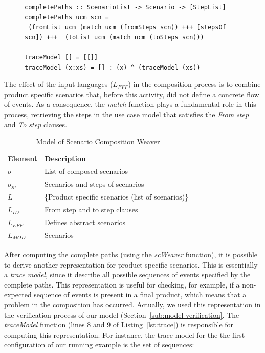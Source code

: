 \documentclass{acm_proc_article-sp}
\begin{document}
{\begin{figure}
\begin{lstlisting}[belowskip=10pt,frame=tb,caption={Scenario composition weaver function},label=lst:trace]
completePaths :: ScenarioList -> Scenario -> [StepList]
completePaths ucm scn =
 (fromList ucm (match ucm (fromSteps scn)) +++ [stepsOf scn]) +++  (toList ucm (match ucm (toSteps scn)))

traceModel [] = [[]]
traceModel (x:xs) = [] : (x) ^ (traceModel (xs))
\end{lstlisting}
\end{figure}

The effect of the input languages ($L_{EFF}$) in the composition process is to combine 
product specific scenarios that, before this activity, did not define a concrete flow of events. As a consequence, the \emph{match} function 
plays a fundamental role in this process, retrieving the steps in the use case model that satisfies the \emph{From step} and \emph{To step} clauses.  

\begin{table}[hbt]
\begin{center}
\caption{Model of Scenario Composition Weaver} \label{tab:sc-weaver}
\begin{tabular}{p{0.4in}p{2.6in}}
   \hline\noalign{\smallskip}
  {\bf Element} & {\bf Description} \\
   \noalign{\smallskip}
   \hline
   \noalign{\smallskip}
   $o$               & List of composed scenarios  \\ 
   $o_{jp}$        & Scenarios and steps of scenarios \\ 
   $L$               & \{Product specific scenarios (list of scenarios)\} \\ 
   $L_{ID}$       & From step and to step clauses \\ 
   $L_{EFF}$    & Defines abstract scenarios  \\ 
   $L_{MOD}$  &  Scenarios \\  
  \hline
  \end{tabular}
\end{center}
\end{table}



After computing the complete paths (using the \emph{scWeaver} function), it is possible to derive another representation for product specific scenarios. This is essentially a \emph{trace model}, since it describe all possible sequences of events specified by the complete paths. This representation is useful for checking, for example, if a non-expected sequence of events is present in a final product, which means that a problem in the composition has occurred. Actually, we used this representation in the verification process of our model (Section~\ref{sub:model-verification}. The \emph{traceModel} function (lines 8 and 9 of Listing~\ref{lst:trace}) is responsible for computing this representation. For instance, the trace model for the the first configuration of our running example is the set of sequences:

}
\end{document}

